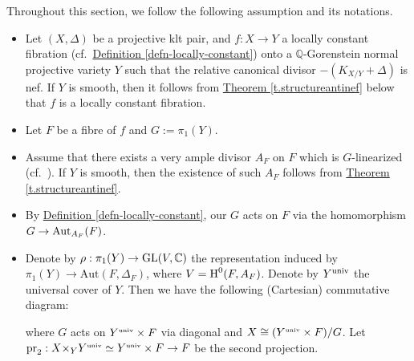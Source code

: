 \begin{assumption}
\label{a.assumption}
Throughout this section, we follow the following assumption and its notations.
\begin{itemize}
    \item Let $(X,\Delta)$ be a projective klt pair, and  $f:X\rightarrow Y$ a locally constant fibration (cf.~{\hyperref[defn-locally-constant]{Definition \ref*{defn-locally-constant}}}) onto a $\mathbb{Q}$-Gorenstein normal projective variety $Y$ such that the relative canonical divisor $-(K_{X/Y}+\Delta)$ is nef. If $Y$ is smooth, then it follows from {\hyperref[t.structureantinef]{Theorem \ref*{t.structureantinef}}} below that $f$ is a locally constant fibration.
    \item Let $F$ be a fibre of $f$ and $G:=\pi_1(Y)$. 
    \item Assume that there exists a very ample  divisor $A_F$ on $F$ which is $G$-linearized (cf.~\cite[Definition 3.2.3, Lemma 3.2.4]{Brion18}). If $Y$ is smooth, then the existence of such $A_F$ follows from {\hyperref[t.structureantinef]{Theorem \ref*{t.structureantinef}}}. 
    \item By {\hyperref[defn-locally-constant]{Definition \ref*{defn-locally-constant}}}, our $G$ acts on  $F$ via the homomorphism $G\to \textup{Aut}_{A_F}(F)$.  
    \item Denote by $\rho: \pi_1(Y) \to \text{GL}(V,\mathbb C)$ the representation induced by $ \pi_1(Y)\rightarrow \text{Aut}(F,\Delta_F)$, where $V=\operatorname{H}^0(F, A_F)$.
Denote by $Y^{\textup{univ}}$ the universal cover of $Y$. 
Then we have the following (Cartesian) commutative diagram:
\begin{center}
\end{center}
where $G$ acts on $Y^{\text{\tiny univ}}\times F$ via diagonal and $X\cong (Y^{\text{\tiny univ}}\times F)/G$.
Let $\operatorname{pr}_2:X{\times}_YY^{\text{\tiny univ}}\simeq Y^{\text{\tiny univ}}\times F\to F$ be the second  projection.
\end{itemize}
\end{assumption}

